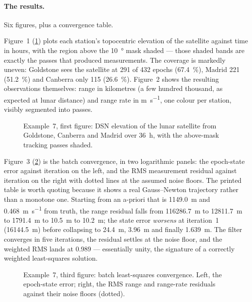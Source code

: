 \paragraph{The results.}
Six figures, plus a convergence table.

Figure~1 (\cref{fig:tut-ex7-vis}) plots each station's topocentric elevation of
the satellite against time in hours, with the region above the \SI{10}{\degree}
mask shaded --- those shaded bands are exactly the passes that produced
measurements. The coverage is markedly uneven: Goldstone sees the satellite at
291 of 432 epochs (\SI{67.4}{\percent}), Madrid 221 (\SI{51.2}{\percent}) and
Canberra only 115 (\SI{26.6}{\percent}). Figure~2 shows the resulting
observations themselves: range in kilometres (a few hundred thousand, as
expected at lunar distance) and range rate in \si{\meter\per\second}, one colour
per station, visibly segmented into passes.

\begin{figure}[htbp]
  \centering
  \caption{Example~7, first figure: DSN elevation of the lunar satellite from
           Goldstone, Canberra and Madrid over \SI{36}{\hour}, with the
           above-mask tracking passes shaded.}
  \label{fig:tut-ex7-vis}
\end{figure}

Figure~3 (\cref{fig:tut-ex7-conv}) is the batch convergence, in two
logarithmic panels: the epoch-state error against iteration on the left, and the
RMS measurement residual against iteration on the right with dotted lines at the
assumed noise floors. The printed table is worth quoting because it shows a real
Gauss--Newton trajectory rather than a monotone one. Starting from an a-priori
that is \SI{1149.0}{\meter} and \SI{0.468}{\meter\per\second} from truth, the
range residual falls from \SI{116286.7}{\meter} to \SI{12811.7}{\meter} to
\SI{1791.4}{\meter} to \SI{10.5}{\meter} to \SI{10.2}{\meter}; the state error
\emph{worsens} at iteration~1 (\SI{16144.5}{\meter}) before collapsing to
\SI{24.4}{\meter}, \SI{3.96}{\meter} and finally \SI{1.639}{\meter}. The filter
converges in five iterations, the residual settles at the noise floor, and the
weighted RMS lands at 0.989 --- essentially unity, the signature of a correctly
weighted least-squares solution.

\begin{figure}[htbp]
  \centering
  \caption{Example~7, third figure: batch least-squares convergence. Left, the
           epoch-state error; right, the RMS range and range-rate residuals
           against their noise floors (dotted).}
  \label{fig:tut-ex7-conv}
\end{figure}

